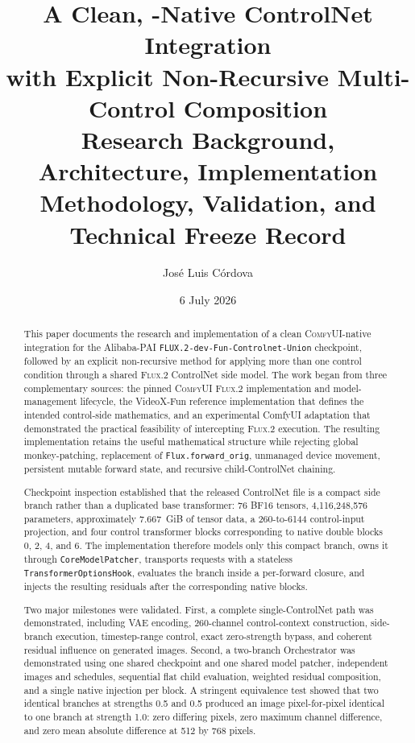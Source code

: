 \documentclass[11pt]{article}
\title{\textbf{A Clean, \ComfyUI-Native \FluxTwo{} ControlNet Integration\\with Explicit Non-Recursive Multi-Control Composition}\\[0.6em]
\large Research Background, Architecture, Implementation Methodology, Validation, and Technical Freeze Record}
\author{Jos\'e Luis C\'ordova}
\date{6 July 2026}
\newcommand{\FluxTwo}{\textsc{Flux.2}}
\newcommand{\ComfyUI}{\textsc{ComfyUI}}
\newcommand{\code}[1]{\texttt{#1}}
\begin{document}
\maketitle

\begin{abstract}
This paper documents the research and implementation of a clean \ComfyUI-native integration for the Alibaba-PAI \code{FLUX.2-dev-Fun-Controlnet-Union} checkpoint, followed by an explicit non-recursive method for applying more than one control condition through a shared \FluxTwo{} ControlNet side model. The work began from three complementary sources: the pinned \ComfyUI{} \FluxTwo{} implementation and model-management lifecycle, the VideoX-Fun reference implementation that defines the intended control-side mathematics, and an experimental ComfyUI adaptation that demonstrated the practical feasibility of intercepting \FluxTwo{} execution. The resulting implementation retains the useful mathematical structure while rejecting global monkey-patching, replacement of \code{Flux.forward\_orig}, unmanaged device movement, persistent mutable forward state, and recursive child-ControlNet chaining.

Checkpoint inspection established that the released ControlNet file is a compact side branch rather than a duplicated base transformer: 76 BF16 tensors, 4,116,248,576 parameters, approximately 7.667~GiB of tensor data, a 260-to-6144 control-input projection, and four control transformer blocks corresponding to native double blocks 0, 2, 4, and 6. The implementation therefore models only this compact branch, owns it through \code{CoreModelPatcher}, transports requests with a stateless \code{TransformerOptionsHook}, evaluates the branch inside a per-forward closure, and injects the resulting residuals after the corresponding native blocks.

Two major milestones were validated. First, a complete single-ControlNet path was demonstrated, including VAE encoding, 260-channel control-context construction, side-branch execution, timestep-range control, exact zero-strength bypass, and coherent residual influence on generated images. Second, a two-branch Orchestrator was demonstrated using one shared checkpoint and one shared model patcher, independent images and schedules, sequential flat child evaluation, weighted residual composition, and a single native injection per block. A stringent equivalence test showed that two identical branches at strengths 0.5 and 0.5 produced an image pixel-for-pixel identical to one branch at strength 1.0: zero differing pixels, zero maximum channel difference, and zero mean absolute difference at 512 by 768 pixels.


\end{abstract}
\end{document}
